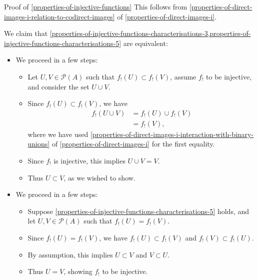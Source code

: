 \begin{Proof}{Proof of \cref{properties-of-injective-functions}}
    This follows from \cref{properties-of-direct-images-i-relation-to-codirect-images} of \cref{properties-of-direct-images-i}.

    We claim that \cref{properties-of-injective-functions-characterisations-3,properties-of-injective-functions-characterisations-5} are equivalent:
    \begin{itemize}
        \item{}We proceed in a few steps:
            \begin{itemize}
                \item Let $U,V\in\mathcal{P}(A)$ such that $f_{!}(U)\subset f_{!}(V)$, assume $f_{!}$ to be injective, and consider the set $U\cup V$.
                \item Since $f_{!}(U)\subset f_{!}(V)$, we have
                    \begin{align*}
                        f_{!}(U\cup V) &= f_{!}(U)\cup f_{!}(V)\\
                                       &= f_{!}(V),
                    \end{align*}
                    where we have used \cref{properties-of-direct-images-i-interaction-with-binary-unions} of \cref{properties-of-direct-images-i} for the first equality.
                \item Since $f_{!}$ is injective, this implies $U\cup V=V$.
                \item Thus $U\subset V$, as we wished to show.
            \end{itemize}
        \item{}We proceed in a few steps:
            \begin{itemize}
                \item Suppose \cref{properties-of-injective-functions-characterisations-5} holds, and let $U,V\in\mathcal{P}(A)$ such that $f_{!}(U)=f_{!}(V)$.
                \item Since $f_{!}(U)=f_{!}(V)$, we have $f_{!}(U)\subset f_{!}(V)$ and $f_{!}(V)\subset f_{!}(U)$.
                \item By assumption, this implies $U\subset V$ and $V\subset U$.
                \item Thus $U=V$, showing $f_{!}$ to be injective.
            \end{itemize}
    \end{itemize}


\end{Proof}
